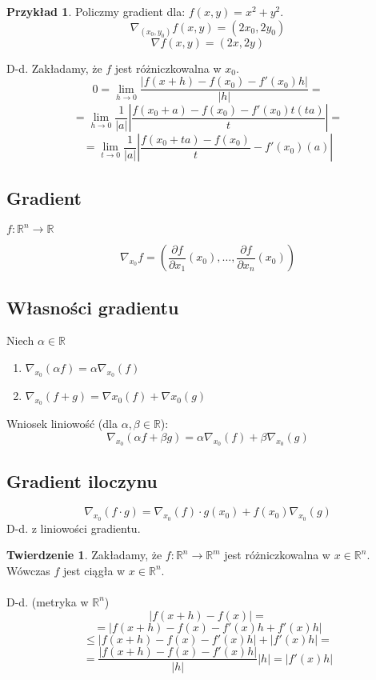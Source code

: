 \documentclass{article}
\theoremstyle{definition}
\theoremstyle{definition}
\newtheorem{tw}{Twierdzenie}[subsection]
\theoremstyle{definition}
\newtheorem{pk}{Przykład}[subsection]
\theoremstyle{definition}
\theoremstyle{definition}
\theoremstyle{definition}
\theoremstyle{definition}
\begin{document}
\begin{pk}
    Policzmy gradient dla: $f(x,y)=x^2+y^2$.
    \[\nabla_(x_0,y_0) f(x,y) = (2x_0, 2y_0)\]
    \[\nabla f(x,y) = (2x,2y)\]
\end{pk}
D-d. Zakładamy, że $f$ jest różniczkowalna w $x_0$. 
\[0=\lim_{h\rightarrow 0} \frac{|f(x+h)-f(x_0)-f'(x_0)h|}{|h|}=\]
\[=\lim_{h\rightarrow 0} \frac{1}{|a|} \left|\frac{f(x_0+a)-f(x_0)-f'(x_0)t(ta)}{t}\right|=\]
\[=\lim_{t\rightarrow 0} \frac{1}{|a|} \left|\frac{f(x_0+ta)-f(x_0)}{t}-f'(x_0)(a)\right|\]

\subsection{Gradient}

$f:\mathbb{R}^n \rightarrow \mathbb{R}$

\[\nabla_{x_0} f = \left(\frac{\partial f}{\partial x_1} (x_0), \dots, \frac{\partial f}{\partial x_n} (x_0)\right)\]

\subsection{Własności gradientu}

Niech $\alpha \in \mathbb{R}$
\begin{enumerate}
    \item $\nabla_{x_0} (\alpha f) = \alpha \nabla_{x_0} (f)$
    \item $\nabla_{x_0} (f+g) = \nabla{x_0} (f) + \nabla{x_0} (g)$
\end{enumerate}
Wniosek liniowość (dla $\alpha,\beta \in \mathbb{R}$):
\[\nabla_{x_0} (\alpha f + \beta g) = \alpha \nabla_{x_0} (f) + \beta \nabla_{x_0} (g)\]

\subsection{Gradient iloczynu}
\[\nabla_{x_0} (f\cdot g) = \nabla_{x_0} (f) \cdot g(x_0) + f(x_0) \nabla_{x_0} (g)\]
D-d. z liniowości gradientu.

\begin{tw}
Zakładamy, że $f: \mathbb{R}^n \rightarrow \mathbb{R}^m$ jest różniczkowalna w $x\in\mathbb{R}^n$.
Wówczas $f$ jest ciągła w $x\in\mathbb{R}^n$.\\\\
D-d. (metryka w $\mathbb{R}^n$)\\
\[|f(x+h)-f(x)|=\]
\[=|f(x+h)-f(x)-f'(x)h + f'(x)h|\]
\[\leq |f(x+h)-f(x)-f'(x)h|+|f'(x)h|=\]
\[=\frac{|f(x+h)-f(x)-f'(x)h|}{|h|} |h| = |f'(x)h|\]
\end{tw}
\end{document}
